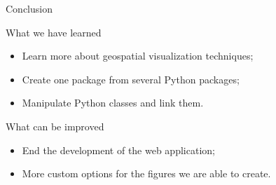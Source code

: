 \begin{frame}[fragile]{Conclusion}

\centering
\begin{block}{What we have learned}
    \begin{itemize}
        \item Learn more about geospatial visualization techniques;
        \item Create one package from several Python packages;
        \item Manipulate Python classes and link them. 
    \end{itemize}
\end{block}

\begin{block}{What can be improved}
    \begin{itemize}
            \item End the development of the web application;
            \item More custom options for the figures we are able to create.
        \end{itemize}
\end{block}

\end{frame}

